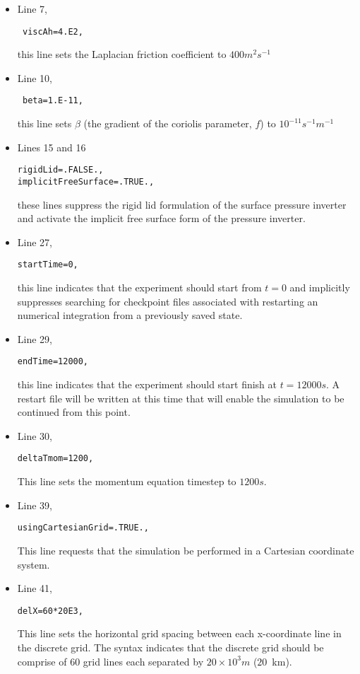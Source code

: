 \begin{itemize}

\item Line 7, \begin{verbatim} viscAh=4.E2, \end{verbatim} this line sets
the Laplacian friction coefficient to $400 m^2s^{-1}$
\item Line 10, \begin{verbatim} beta=1.E-11, \end{verbatim} this line sets
$\beta$ (the gradient of the coriolis parameter, $f$) to $10^{-11} s^{-1}m^{-1}$

\item Lines 15 and 16
\begin{verbatim}
rigidLid=.FALSE.,
implicitFreeSurface=.TRUE.,
\end{verbatim}
these lines suppress the rigid lid formulation of the surface
pressure inverter and activate the implicit free surface form
of the pressure inverter.

\item Line 27,
\begin{verbatim}
startTime=0,
\end{verbatim}
this line indicates that the experiment should start from $t=0$
and implicitly suppresses searching for checkpoint files associated
with restarting an numerical integration from a previously saved state.

\item Line 29,
\begin{verbatim}
endTime=12000,
\end{verbatim}
this line indicates that the experiment should start finish at $t=12000s$.
A restart file will be written at this time that will enable the
simulation to be continued from this point.

\item Line 30,
\begin{verbatim}
deltaTmom=1200,
\end{verbatim}
This line sets the momentum equation timestep to $1200s$.

\item Line 39,
\begin{verbatim}
usingCartesianGrid=.TRUE.,
\end{verbatim}
This line requests that the simulation be performed in a 
Cartesian coordinate system.

\item Line 41,
\begin{verbatim}
delX=60*20E3,
\end{verbatim}
This line sets the horizontal grid spacing between each x-coordinate line
in the discrete grid. The syntax indicates that the discrete grid
should be comprise of $60$ grid lines each separated by $20 \times 10^{3}m$
($20$~km).


\end{itemize}

